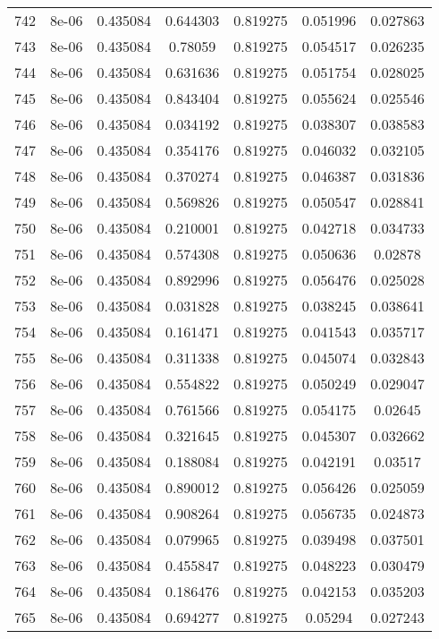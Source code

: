 \begin{table}
\begin{tabular*}{\linewidth}{c|c|c|c|c|c|c}
742 & 8e-06 & 0.435084 & 0.644303 & 0.819275 & 0.051996 & 0.027863\\
743 & 8e-06 & 0.435084 & 0.78059 & 0.819275 & 0.054517 & 0.026235\\
744 & 8e-06 & 0.435084 & 0.631636 & 0.819275 & 0.051754 & 0.028025\\
745 & 8e-06 & 0.435084 & 0.843404 & 0.819275 & 0.055624 & 0.025546\\
746 & 8e-06 & 0.435084 & 0.034192 & 0.819275 & 0.038307 & 0.038583\\
747 & 8e-06 & 0.435084 & 0.354176 & 0.819275 & 0.046032 & 0.032105\\
748 & 8e-06 & 0.435084 & 0.370274 & 0.819275 & 0.046387 & 0.031836\\
749 & 8e-06 & 0.435084 & 0.569826 & 0.819275 & 0.050547 & 0.028841\\
750 & 8e-06 & 0.435084 & 0.210001 & 0.819275 & 0.042718 & 0.034733\\
751 & 8e-06 & 0.435084 & 0.574308 & 0.819275 & 0.050636 & 0.02878\\
752 & 8e-06 & 0.435084 & 0.892996 & 0.819275 & 0.056476 & 0.025028\\
753 & 8e-06 & 0.435084 & 0.031828 & 0.819275 & 0.038245 & 0.038641\\
754 & 8e-06 & 0.435084 & 0.161471 & 0.819275 & 0.041543 & 0.035717\\
755 & 8e-06 & 0.435084 & 0.311338 & 0.819275 & 0.045074 & 0.032843\\
756 & 8e-06 & 0.435084 & 0.554822 & 0.819275 & 0.050249 & 0.029047\\
757 & 8e-06 & 0.435084 & 0.761566 & 0.819275 & 0.054175 & 0.02645\\
758 & 8e-06 & 0.435084 & 0.321645 & 0.819275 & 0.045307 & 0.032662\\
759 & 8e-06 & 0.435084 & 0.188084 & 0.819275 & 0.042191 & 0.03517\\
760 & 8e-06 & 0.435084 & 0.890012 & 0.819275 & 0.056426 & 0.025059\\
761 & 8e-06 & 0.435084 & 0.908264 & 0.819275 & 0.056735 & 0.024873\\
762 & 8e-06 & 0.435084 & 0.079965 & 0.819275 & 0.039498 & 0.037501\\
763 & 8e-06 & 0.435084 & 0.455847 & 0.819275 & 0.048223 & 0.030479\\
764 & 8e-06 & 0.435084 & 0.186476 & 0.819275 & 0.042153 & 0.035203\\
765 & 8e-06 & 0.435084 & 0.694277 & 0.819275 & 0.05294 & 0.027243\\
\end{tabular*}
\end{table}
